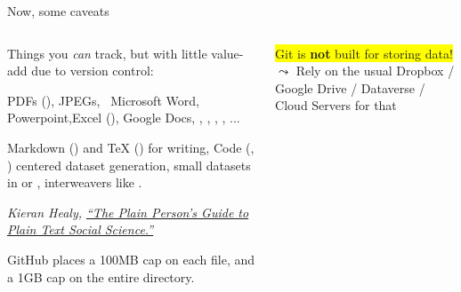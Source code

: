 \documentclass[ignorenonframetext, 10pt, aspectratio=169]{beamer}
\begin{document}
\begin{frame}{Now, some caveats}
\begin{columns}[T]
\begin{column}{0.5\textwidth}

  Things you \emph{can} track, but with little value-add due to version control:\\

  \medskip

   {\small \pause PDFs (), \pause JPEGs,\pause~ Microsoft Word, \pause Powerpoint,\pause Excel (), \pause Google Docs, \pause {}, , , , ...}
\pause
  \pause

 {\small Markdown () and TeX () for writing,  \pause Code (, ) centered dataset generation, small datasets in  or , \pause interweavers  like .} \pause

\bigskip
 {\footnotesize \emph{Kieran Healy, \href{https://kieranhealy.org/publications/plain-person-text/}{``The Plain Person’s Guide to Plain Text Social Science.''}}}

\medskip

 {\footnotesize GitHub places a 100MB cap on each file, and a 1GB cap on the entire directory.}

\end{column}
\begin{column}{0.5\textwidth}
  \colorbox{yellow}{Git is {\textbf{not}} built for storing data!}\\
\centering
{}
\flushleft
$\leadsto$ Rely on the usual Dropbox / Google Drive / Dataverse / Cloud Servers for that
\end{column}
\end{columns}
\end{frame}
\end{document}
